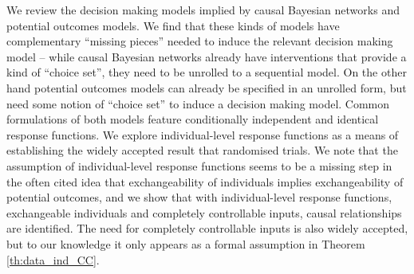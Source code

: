 We review the decision making models implied by causal Bayesian networks and potential outcomes models. We find that these kinds of models have complementary ``missing pieces'' needed to induce the relevant decision making model -- while causal Bayesian networks already have interventions that provide a kind of ``choice set'', they need to be unrolled to a sequential model. On the other hand potential outcomes models can already be specified in an unrolled form, but need some notion of ``choice set'' to induce a decision making model. Common formulations of both models feature conditionally independent and identical response functions. We explore individual-level response functions as a means of establishing the widely accepted result that randomised trials. We note that the assumption of individual-level response functions seems to be a missing step in the often cited idea that exchangeability of individuals implies exchangeability of potential outcomes, and we show that with individual-level response functions, exchangeable individuals and completely controllable inputs, causal relationships are identified. The need for completely controllable inputs is also widely accepted, but to our knowledge it only appears as a formal assumption in Theorem \ref{th:data_ind_CC}.